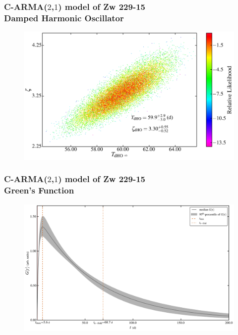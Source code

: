 \documentclass[hyperref={pdfpagelabels=false}]{beamer}
\begin{document}
\begin{frame}
\frametitle{C-ARMA($2$,$1$) model of Zw 229-15\\Damped Harmonic Oscillator}
  \begin{figure}
    \includegraphics[scale=0.065]{images/Zw229-15_DampedHO.jpg}
  \end{figure}
\end{frame}

\begin{frame}
\frametitle{C-ARMA($2$,$1$) model of Zw 229-15\\Green's Function}
  \begin{figure}
    \includegraphics[scale=0.065]{images/Zw229-15_GF.jpg}
  \end{figure}
\end{frame}
\end{document}
